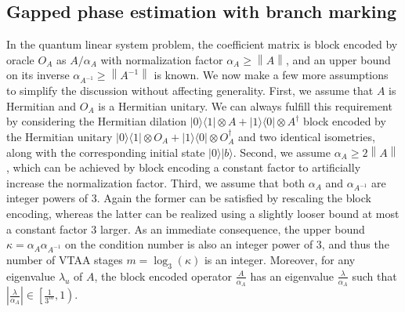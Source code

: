 \documentclass[letterpaper,onecolumn,11pt,accepted=2026-02-14]{quantumarticle}
\newcommand{\abs}[1]{\left\lvert#1\right\rvert}
\newcommand{\norm}[1]{\left\lVert#1\right\rVert}
\theoremstyle{remark}
\theoremstyle{plain}
\newcommand{\ket}[1]{|#1\rangle}
\newcommand{\bra}[1]{\langle#1|}
\newcommand{\ketbra}[2]{\ket{#1}\!\bra{#2}}
\begin{document}
\subsection{Gapped phase estimation with branch marking}
\label{sec:dinv_branch}
In the quantum linear system problem, the coefficient matrix is block encoded by oracle $O_A$ as $A/\alpha_A$ with normalization factor $\alpha_A\geq\norm{A}$, and an upper bound on its inverse $\alpha_{A^{-1}}\geq\norm{A^{-1}}$ is known. We now make a few more assumptions to simplify the discussion without affecting generality. First, we assume that $A$ is Hermitian and $O_A$ is a Hermitian unitary. We can always fulfill this requirement by considering the Hermitian dilation $\ketbra{0}{1}\otimes A+\ketbra{1}{0}\otimes A^\dagger$ block encoded by the Hermitian unitary $\ketbra{0}{1}\otimes O_A+\ketbra{1}{0}\otimes O_A^\dagger$ and two identical isometries, along with the corresponding initial state $\ket{0}\ket{b}$. Second, we assume $\alpha_A\geq2\norm{A}$, which can be achieved by block encoding a constant factor to artificially increase the normalization factor. Third, we assume that both $\alpha_A$ and $\alpha_{A^{-1}}$ are integer powers of $3$. Again the former can be satisfied by rescaling the block encoding, whereas the latter can be realized using a slightly looser bound at most a constant factor $3$ larger.
As an immediate consequence, the upper bound $\kappa=\alpha_A\alpha_{A^{-1}}$ on the condition number is also an integer power of $3$, and thus the number of VTAA stages $m=\log_3(\kappa)$ is an integer. Moreover, for any eigenvalue $\lambda_u$ of $A$, the block encoded operator $\frac{A}{\alpha_A}$ has an eigenvalue $\frac{\lambda}{\alpha_A}$ such that $\abs{\frac{\lambda}{\alpha_A}}\in\left[\frac{1}{3^{m}},1\right)$.
\end{document}
